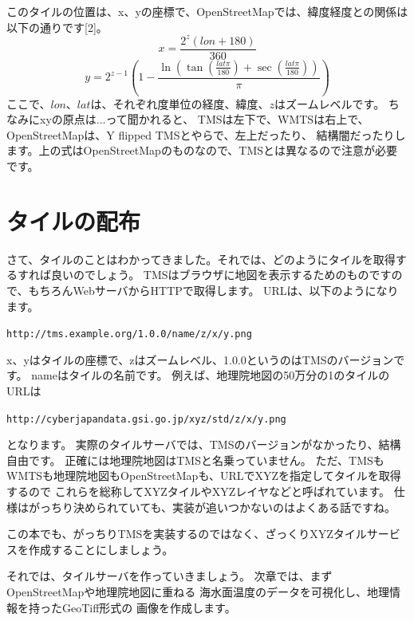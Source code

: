 このタイルの位置は、x、yの座標で、OpenStreetMapでは、緯度経度との関係は以下の通りです[2]。
\[
x = \frac{2^z(lon+180)}{360}
\]
\[
y = 2^{z-1}(1-\frac{\ln(\tan(\frac{lat\pi}{180})+\sec(\frac{lat\pi}{180}))}{\pi})
\]
ここで、$lon$、$lat$は、それぞれ度単位の経度、緯度、$z$はズームレベルです。
ちなみにxyの原点は...って聞かれると、
TMSは左下で、WMTSは右上で、OpenStreetMapは、Y flipped TMSとやらで、左上だったり、
結構闇だったりします。上の式はOpenStreetMapのものなので、TMSとは異なるので注意が必要です。

\section*{タイルの配布}
さて、タイルのことはわかってきました。それでは、どのようにタイルを取得するすれば良いのでしょう。
TMSはブラウザに地図を表示するためのものですので、もちろんWebサーバからHTTPで取得します。
URLは、以下のようになります。
\begin{center}
  \texttt{http://tms.example.org/1.0.0/name/z/x/y.png}
\end{center}

x、yはタイルの座標で、zはズームレベル、1.0.0というのはTMSのバージョンです。
nameはタイルの名前です。
例えば、地理院地図の50万分の1のタイルのURLは
\begin{center}
  \texttt{http://cyberjapandata.gsi.go.jp/xyz/std/z/x/y.png}
\end{center}
となります。
実際のタイルサーバでは、TMSのバージョンがなかったり、結構自由です。
正確には地理院地図はTMSと名乗っていません。
ただ、TMSもWMTSも地理院地図もOpenStreetMapも、URLでXYZを指定してタイルを取得するので
これらを総称してXYZタイルやXYZレイヤなどと呼ばれています。
仕様はがっちり決められていても、実装が追いつかないのはよくある話ですね。

この本でも、がっちりTMSを実装するのではなく、ざっくりXYZタイルサービスを作成することにしましょう。

それでは、タイルサーバを作っていきましょう。
次章では、まずOpenStreetMapや地理院地図に重ねる
海水面温度のデータを可視化し、地理情報を持ったGeoTiff形式の
画像を作成します。
